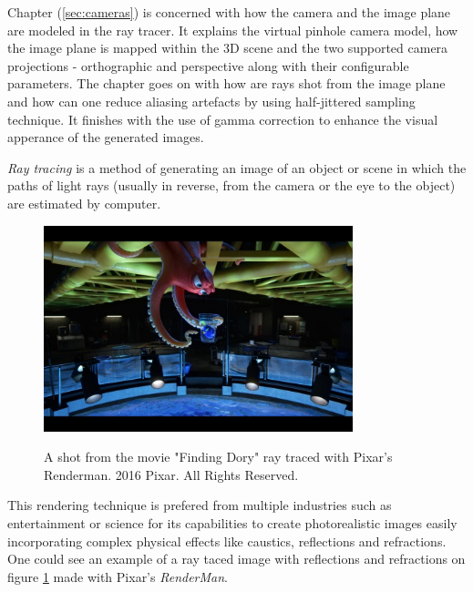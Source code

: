 \documentclass{article}
\begin{document}
\vspace*{\baselineskip}

Chapter (\ref{sec:cameras}) is concerned with how the camera and the image plane are modeled in the ray tracer. It explains the virtual pinhole camera model, how the image plane is mapped within the 3D scene and the two supported camera projections - orthographic and perspective along with their configurable parameters. The chapter goes on with how are rays shot from the image plane and how can one reduce aliasing artefacts by using half-jittered sampling technique. It finishes with the use of gamma correction to enhance the visual apperance of the generated images. 

\vspace*{\baselineskip}





\textit{Ray tracing} is a method of generating an image of an object or scene in which the paths of light rays (usually in reverse, from the camera or the eye to the object) are estimated by computer. \cite{oxford_dict} 

\begin{figure}[h!]
    \caption{A shot from the movie "Finding Dory" ray traced with Pixar's Renderman. 2016 Pixar. All Rights Reserved.}
    \centering
    \includegraphics[width=0.8\textwidth]{finding_dory_shot}
    \label{fig:finding_dory}
\end{figure}

This rendering technique is prefered from multiple industries such as entertainment or science for its capabilities to create photorealistic images easily incorporating complex physical effects like caustics, reflections and refractions. One could see an example of a ray taced image with reflections and refractions on figure \ref{fig:finding_dory} made with Pixar's \textit{RenderMan}.
\end{document}
